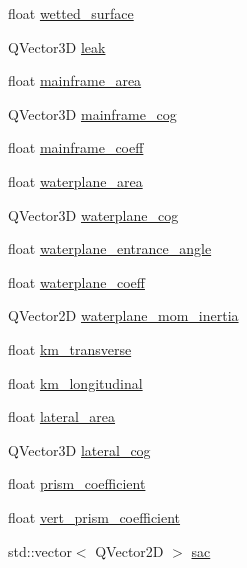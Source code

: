 \begin{DoxyCompactItemize}
\item 
float \hyperlink{structShipCAD_1_1HydrostaticsData_ad4b78176732ea80000adb94b5b5669f3}{wetted\-\_\-surface}
\item 
Q\-Vector3\-D \hyperlink{structShipCAD_1_1HydrostaticsData_a1132babc4274499418c2dc8ea6f86314}{leak}
\item 
float \hyperlink{structShipCAD_1_1HydrostaticsData_ab2b49d5dea89ae998116c8ff4cac2b53}{mainframe\-\_\-area}
\item 
Q\-Vector3\-D \hyperlink{structShipCAD_1_1HydrostaticsData_ab726ebe5c185d197a25e4477576266a4}{mainframe\-\_\-cog}
\item 
float \hyperlink{structShipCAD_1_1HydrostaticsData_a4208b97fe6110516d71e67708186897a}{mainframe\-\_\-coeff}
\item 
float \hyperlink{structShipCAD_1_1HydrostaticsData_a5f3432f4d790bbb9c4d75502cb15b7f0}{waterplane\-\_\-area}
\item 
Q\-Vector3\-D \hyperlink{structShipCAD_1_1HydrostaticsData_ac100876d13ae75147585c5c0f80801fe}{waterplane\-\_\-cog}
\item 
float \hyperlink{structShipCAD_1_1HydrostaticsData_a3e22cf4f03f02a3c0d14e7f66610fd80}{waterplane\-\_\-entrance\-\_\-angle}
\item 
float \hyperlink{structShipCAD_1_1HydrostaticsData_a4d5eb630367999a611b95dd0d2c2242c}{waterplane\-\_\-coeff}
\item 
Q\-Vector2\-D \hyperlink{structShipCAD_1_1HydrostaticsData_a2a662521564e9c0160c15acf9d3121f9}{waterplane\-\_\-mom\-\_\-inertia}
\item 
float \hyperlink{structShipCAD_1_1HydrostaticsData_adbadaf4eafa63f1f10778f4c3e1f61a4}{km\-\_\-transverse}
\item 
float \hyperlink{structShipCAD_1_1HydrostaticsData_a0a51e62f7d169fa892eaabc6a1937256}{km\-\_\-longitudinal}
\item 
float \hyperlink{structShipCAD_1_1HydrostaticsData_a1ba65b28e4351a4d97bc64cd11ddab90}{lateral\-\_\-area}
\item 
Q\-Vector3\-D \hyperlink{structShipCAD_1_1HydrostaticsData_adc0c4f2f0c5b110a968e45642dc5eeeb}{lateral\-\_\-cog}
\item 
float \hyperlink{structShipCAD_1_1HydrostaticsData_acabee310fcde293fcb0d9a5fd5effe27}{prism\-\_\-coefficient}
\item 
float \hyperlink{structShipCAD_1_1HydrostaticsData_a2a7fc6a194bc1e78ecce8ab16512d1eb}{vert\-\_\-prism\-\_\-coefficient}
\item 
std\-::vector$<$ Q\-Vector2\-D $>$ \hyperlink{structShipCAD_1_1HydrostaticsData_a503a1f2299db9d5ae923e598b8ee31ba}{sac}
\end{DoxyCompactItemize}


